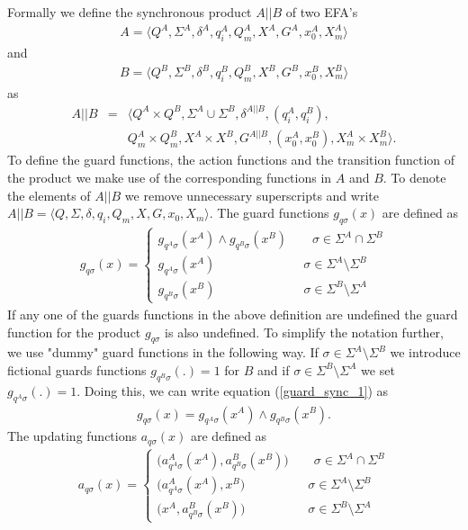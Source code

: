 \documentclass{article}
\begin{document}
Formally we define the synchronous product $A||B$ of two EFA's
\begin{eqnarray}
A=\langle Q^A, \Sigma^A, \delta^A, q^A_i, Q^A_m, X^{A},
G^A,x^A_0,X^A_m \rangle
\end{eqnarray} and \begin{eqnarray} B=\langle Q^B, \Sigma^B, \delta^B, q^B_i,
Q^B_m, X^{B}, G^B,x^B_0,X^B_m \rangle
\end{eqnarray} as
\begin{eqnarray}
A||B&=&\langle Q^A\times Q^B, \Sigma^A \cup \Sigma^B ,
\delta^{A||B}, (q^A_i,q^B_i) ,\nonumber\\
&& Q^A_m\times Q^B_m, X^A \times X^B, G^{A||B},(x^A_0,x^B_0),
X^A_m \times X^B_m \rangle.
\end{eqnarray}
To define the guard functions, the action functions and the
transition function of the product we make use of the
corresponding functions in $A$ and $B$. To denote the elements of
$A||B$ we remove unnecessary  superscripts and write $A||B=\langle
Q, \Sigma, \delta, q_i, Q_m, X, G ,x_0, X_m \rangle$. The guard
functions $g_{q \sigma}(x)$ are defined as
\begin{eqnarray}\label{guard_sync_1}
g_{q \sigma}(x)=\left\{
\begin{array}{ll}
g_{q^A\sigma}(x^{A})\wedge g_{q^B\sigma}(x^{B}) \quad\quad\sigma\in \Sigma^A \cap \Sigma^B\\
g_{q^A\sigma}(x^{A})\quad\quad\quad\quad\quad\quad\quad\sigma\in \Sigma^A\setminus\Sigma^B\\
g_{q^B\sigma}(x^{B})\quad\quad\quad\quad\quad\quad\quad\sigma\in\Sigma^B\setminus\Sigma^A
\end{array}\right.
\end{eqnarray}
If any one of the guards functions in the above definition are
undefined the guard function for the product $g_{q \sigma}$ is
also undefined. To simplify the notation further, we use "dummy"
guard functions in the following way. If $\sigma\in \Sigma^A
\setminus \Sigma^B$ we introduce fictional guards functions
$g_{q^B\sigma}(.)=1$ for $B$ and if $\sigma\in\Sigma^B\setminus
\Sigma^A$ we set $g_{q^A\sigma}(.)=1$. Doing this, we can write
equation (\ref{guard_sync_1}) as
\begin{eqnarray}
g_{q \sigma}(x)= g_{q^A\sigma}(x^{A})\wedge g_{q^B\sigma}(x^{B}).
\end{eqnarray}
The updating functions $a_{q \sigma}(x)$ are defined as
\begin{eqnarray}\label{action_sync_1}
a_{q \sigma}(x)=\left\{
\begin{array}{ll}
 \big(a^A_{q^A \sigma}(x^{A}), a^B_{q^B \sigma}(x^{B})\big)\quad\quad\sigma\in \Sigma^A \cap \Sigma^B\\
\big(a^A_{q^A\sigma}(x^{A}),x^{B}\big)\quad\quad\quad\quad\quad\sigma\in\Sigma^A\setminus\Sigma^B\\
\big(x^{A},a^B_{q^B\sigma}(x^{B})\big)\quad\quad\quad\quad\quad\sigma\in\Sigma^B\setminus\Sigma^A
\end{array}\right.
\end{eqnarray}
\end{document}
